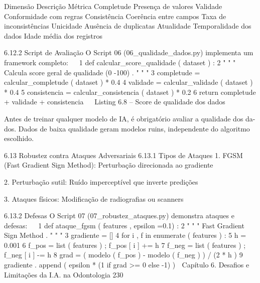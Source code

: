           Dimensão         Descrição                        Métrica
          Completude       Presença de valores              %
          Validade         Conformidade com regras          %
          Consistência     Coerência entre campos           Taxa de inconsistências
          Unicidade        Ausência de duplicatas           %
          Atualidade       Temporalidade dos dados          Idade média dos registros



 6.12.2     Script de Avaliação
 O Script 06 (06_qualidade_dados.py) implementa um framework completo:
                                                                                                  
1 def calcular_score_qualidade ( dataset ) :
2     " " " Calcula score geral de qualidade (0 -100) . " " "
3     completude = calcular_completude ( dataset ) * 0.4
4     validade = calcular_validade ( dataset ) * 0.4
5     consistencia = calcular_consistencia ( dataset ) * 0.2
6     return completude + validade + consistencia
                                                                                                  
                         Listing 6.8 – Score de qualidade dos dados


     Antes de treinar qualquer modelo de IA, é obrigatório avaliar a qualidade dos da-
     dos. Dados de baixa qualidade geram modelos ruins, independente do algoritmo
     escolhido.


 6.13       Robustez contra Ataques Adversariais
 6.13.1     Tipos de Ataques
     1. FGSM (Fast Gradient Sign Method): Perturbação direcionada ao gradiente

     2. Perturbação sutil: Ruído imperceptível que inverte predições

     3. Ataques físicos: Modificação de radiografias ou scanners

 6.13.2     Defesas
 O Script 07 (07_robustez_ataques.py) demonstra ataques e defesas:
                                                                                                  
1 def ataque_fgsm ( features , epsilon =0.1) :
2     " " " Fast Gradient Sign Method . " " "
3     gradiente = []
4     for i , f in enumerate ( features ) :
5            h = 0.001
6            f_pos = list ( features ) ; f_pos [ i ] += h
7            f_neg = list ( features ) ; f_neg [ i ] -= h
8            grad = ( modelo ( f_pos ) - modelo ( f_neg ) ) / (2 * h )
9            gradiente . append ( epsilon * (1 if grad >= 0 else -1) )
     Capítulo 6. Desafios e Limitações da I.A. na Odontologia                                230


